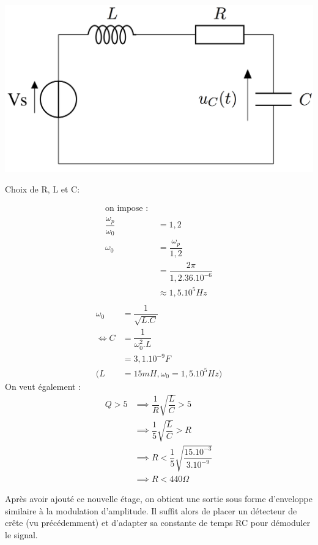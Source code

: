 \documentclass[12pt,a4paper]{article}
\begin{document}
\begin{center}
\includegraphics[scale=1]{fig1.jpg} 
\end{center}
Choix de R, L et C:

\begin{multicols}{2}
\setlength{\columnseprule}{0.4pt}
\begin{align*}
\text{on impose : }\\
\dfrac{\omega_p}{\omega_0}&=1,2\\
\omega_0 &= \dfrac{\omega_p}{1,2}\\
&=\dfrac{2\pi}{1,2.36.10^{-6}}\\
&\approx 1,5.10^5Hz\\
\end{align*}
\columnbreak
\begin{align*}
\omega_0 &= \dfrac{1}{\sqrt{L.C}} \\
\iff C&=\dfrac{1}{\omega_0^2.L}\\
&=3,1.10^{-9}F \\
(L&=15mH,\omega_0=1,5.10^5Hz)
\end{align*}
On veut également :
\begin{align*}
Q>5 &\implies \dfrac {1} {R}\sqrt {\dfrac {L} {C}}>5\\
&\implies \dfrac {1} {5}\sqrt {\dfrac {L} {C}}>R\\
&\implies R<\dfrac {1} {5}\sqrt {\dfrac {15.10^{-3}} {3.10^{-9}}}\\
&\implies R<440\Omega
\end{align*}
\end{multicols}
Après avoir ajouté ce nouvelle étage, on obtient une sortie sous forme d'enveloppe similaire à la modulation d'amplitude. Il suffit alors de placer un détecteur de crête (vu précédemment) et d'adapter sa constante de temps RC pour démoduler le signal.
\end{document}

